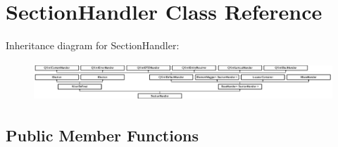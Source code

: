 \hypertarget{class_section_handler}{}\section{Section\+Handler Class Reference}
\label{class_section_handler}
Inheritance diagram for Section\+Handler\+:\begin{figure}[H]
\begin{center}
\leavevmode
\includegraphics[height=1.461187cm]{class_section_handler}
\end{center}
\end{figure}
\subsection*{Public Member Functions}
